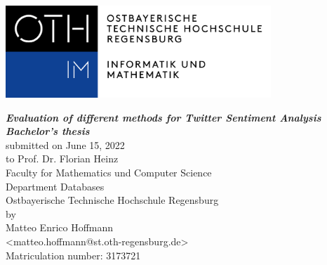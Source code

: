 \begin{titlepage}

\includegraphics[angle=0,width=10cm]{Titelseite/oth.png}

\begin{center}
\vspace*{2\baselineskip}
\LARGE \textbf{\textsf{\textit{
Evaluation of different methods for Twitter Sentiment Analysis
}}} \\
\vspace{1cm}
\LARGE\textbf{\textsf{\textit{Bachelor's thesis}}} \\
\vspace{1cm}
\Large{
submitted on June 15, 2022 \\
to Prof. Dr. Florian Heinz \\
Faculty for Mathematics und Computer Science \\
Department Databases \\
Ostbayerische Technische Hochschule Regensburg \\
\vspace{1cm}
by \\
Matteo Enrico Hoffmann \\
<matteo.hoffmann@st.oth-regensburg.de> \\
Matriculation number: 3173721 \\
}
\vspace{1cm}

\end{center}

\end{titlepage}

